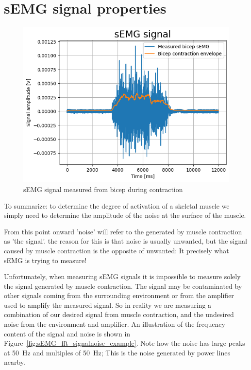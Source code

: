 \section{sEMG signal properties}
\begin{figure}[h!t]
	\begin{center}
		\includegraphics[width=0.7\columnwidth]{images/sEMG_signal_example.png}
	\end{center}
	\caption{sEMG signal measured from bicep during contraction}
	\label{fig:sEMG_signal_example}
\end{figure}

To summarize: to determine the degree of activation of a skeletal muscle we simply need to determine the amplitude of the noise at the surface of the muscle.

From this point onward 'noise' will refer to the generated by muscle contraction as 'the signal'. the reason for this is that noise is usually unwanted, but the signal caused by muscle contraction is the opposite of unwanted: It precisely what sEMG is trying to measure! 

Unfortunately, when measuring sEMG signals it is impossible to measure solely the signal generated by muscle contraction. The signal may be contaminated by other signals coming from the surrounding environment or from the amplifier used to amplify the measured signal. So in reality we are measuring a combination of our desired signal from muscle contraction, and the undesired noise from the environment and amplifier. An illustration of the frequency content of the signal and noise is shown in Figure~\ref{fig:sEMG_fft_signalnoise_example}. Note how the noise has large peaks at \SI{50}{\hertz} and multiples of \SI{50}{\hertz}; This is the noise generated by power lines nearby. 

